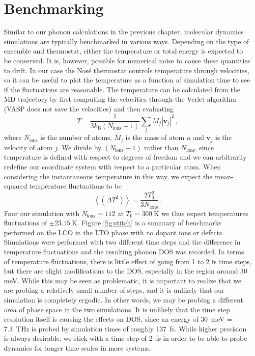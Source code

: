 \section{Benchmarking}
Similar to our phonon calculations in the previous chapter, molecular dynamics simulations are typically benchmarked in various ways. Depending on the type of ensemble and thermostat, either the temperature or total energy is expected to be conserved. It is, however, possible for numerical noise to cause these quantities to drift. In our case the Nos\'{e} thermostat controls temperature through velocities, so it can be useful to plot the temperature as a function of simulation time to see if the fluctuations are reasonable. The temperature can be calculated from the MD trajectory by first computing the velocities through the Verlet algorithm (VASP does not save the velocities) and then evaluating
%
\[ T = \frac{1}{3 k_\text{B} (N_\text{ions}-1)} \sum_j M_j |\bm{v}_j|^2 \, , \]
%
where $N_\text{ions}$ is the number of atoms, $M_j$ is the mass of atom $n$ and $\bm{v}_j$ is the velocity of atom $j$. We divide by $(N_\text{ions} - 1)$ rather than $N_\text{ions}$, since temperature is defined with respect to degrees of freedom and we can arbitrarily redefine our coordinate system with respect to a particular atom. When considering the instantaneous temperature in this way, we expect the mean-squared temperature fluctuations to be \cite{Hickman2016}
%
\[ \left\langle \left( \Delta T^2 \right) \right\rangle = \frac{2T_0^2}{3N_\text{ions}} \, . \]
%
Four our simulation with $N_\text{ions} = 112$ at $T_0 = \SI{300}{\kelvin}$ we thus expect temperatures fluctuations of $\pm \SI{23.15}{\kelvin}$. Figure \ref{fig:stitch} is a summary of benchmarks performed on the LCO in the LTO phase with no dopant ions or defects. Simulations were performed with two different time steps and the difference in temperature fluctuations and the resulting phonon DOS was recorded. In terms of temperature fluctuations, there is little effect of going from 1 to 2 fs time steps, but there are slight modifications to the DOS, especially in the region around 30 meV. While this may be seen as problematic, it is important to realize that we are probing a relatively small number of steps, and it is unlikely that our simulation is completely ergodic. In other words, we may be probing a different area of phase space in the two simulations. It is unlikely that the time step resolution itself is causing the effects on DOS, since an energy of \SI{30}{\milli\eV} = \SI{7.3}{\tera\hertz} is probed by simulation times of roughly \SI{137}{\femto\second}. While higher precision is always desirable, we stick with a time step of \SI{2}{\femto\second} in order to be able to probe dynamics for longer time scales in more systems.

